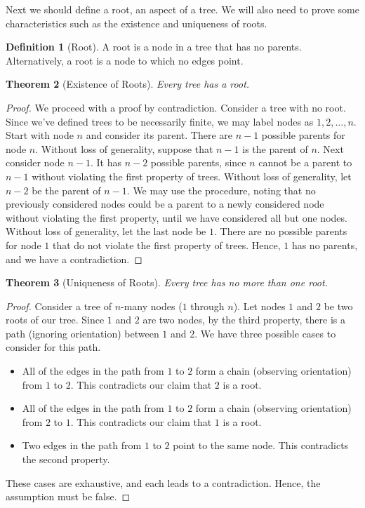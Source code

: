 \documentclass[12pt]{article}
\newtheorem{theorem}{Theorem}[section]
\theoremstyle{definition}
\newtheorem{definition}[theorem]{Definition}
\theoremstyle{remark}
\begin{document}
Next we should define a root, an aspect of a tree. We will also need to prove some characteristics such as the existence and uniqueness of roots.

\begin{definition}[Root]
A root is a node in a tree that has no parents. Alternatively, a root is a node to which no edges point.
\end{definition}

\begin{theorem}[Existence of Roots]
Every tree has a root.
\end{theorem}

\begin{proof}
We proceed with a proof by contradiction. Consider a tree with no root. Since we've defined trees to be necessarily finite, we may label nodes as $1 , 2 , ... , n$. Start with node $n$ and consider its parent. There are $n-1$ possible parents for node $n$. Without loss of generality, suppose that
$n-1$ is the parent of $n$. Next consider node $n-1$. It has $n-2$ possible parents, since $n$ cannot be a parent to $n-1$ without violating the first property of trees. Without loss of generality, let $n-2$ be the parent of $n-1$. We may use the procedure, noting that no previously considered nodes
could be a parent to a newly considered node without violating the first property, until we have considered all but one nodes. Without loss of generality, let the last node be $1$. There are no possible parents for node $1$ that do not violate the first property of trees. Hence, $1$ has no parents, and
we have a contradiction.
\end{proof}

\begin{theorem}[Uniqueness of Roots]
Every tree has no more than one root.
\end{theorem}

\begin{proof}
Consider a tree of $n$-many nodes ($1$ through $n$). Let nodes $1$ and $2$ be two roots of our tree. Since $1$ and $2$ are two nodes, by the third property, there is a path (ignoring orientation) between $1$ and $2$. We have three possible cases to consider for this path.
\begin{itemize}
	\item{All of the edges in the path from $1$ to $2$ form a chain (observing orientation) from $1$ to $2$. This contradicts our claim that $2$ is a root.}
	\item{All of the edges in the path from $1$ to $2$ form a chain (observing orientation) from $2$ to $1$. This contradicts our claim that $1$ is a root.}
	\item{Two edges in the path from $1$ to $2$ point to the same node. This contradicts the second property.}
\end{itemize}
These cases are exhaustive, and each leads to a contradiction. Hence, the assumption must be false.
\end{proof}
\end{document}
